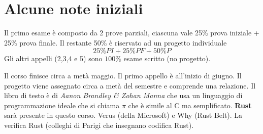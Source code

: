 \section{Alcune note iniziali}
Il primo esame è composto da 2 prove parziali, ciascuna  vale 25\% prova iniziale + 25\% prova finale. Il restante 50\% è riservato ad un progetto individuale $$25\%PI+25\%PF+50\% P$$
Gli altri appelli (2,3,4 e 5) sono $100\%$ esame scritto (no progetto).

Il corso finisce circa a metà maggio. Il primo appello è all'inizio di giugno. Il progetto viene assegnato circa a metà del semestre e comprende una relazione. Il libro di testo è di \textit{Aanon Brandley \& Zohan Manna} che usa un linguaggio di programmazione ideale che si chiama $\pi$ che è simile al C ma semplificato. \textbf{Rust} sarà presente in questo corso. Verus (della Microsoft) e Why (Rust Belt). La verifica Rust (colleghi di Parigi che insegnano codifica Rust).
